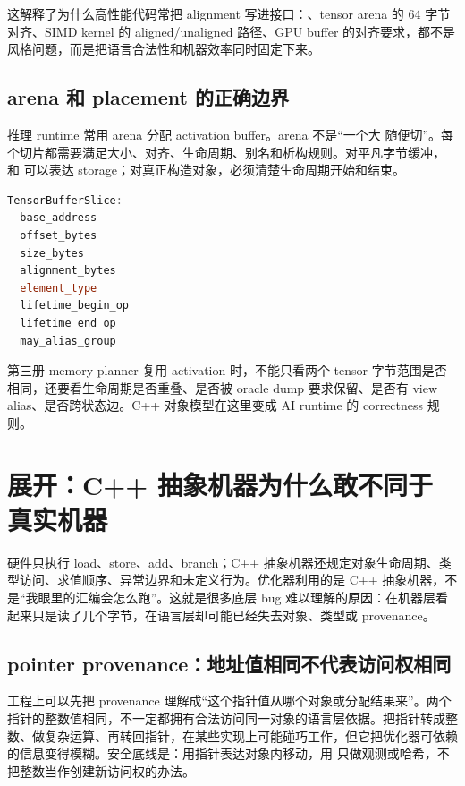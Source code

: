 这解释了为什么高性能代码常把 alignment 写进接口：、tensor arena 的 64 字节对齐、SIMD kernel 的 aligned/unaligned 路径、GPU buffer 的对齐要求，都不是风格问题，而是把语言合法性和机器效率同时固定下来。

\subsection{arena 和 placement 的正确边界}

推理 runtime 常用 arena 分配 activation buffer。arena 不是“一个大  随便切”。每个切片都需要满足大小、对齐、生命周期、别名和析构规则。对平凡字节缓冲， 和  可以表达 storage；对真正构造对象，必须清楚生命周期开始和结束。

\begin{lstlisting}[language=C++,caption={arena 设计要记录的不只是 offset}]
TensorBufferSlice:
  base_address
  offset_bytes
  size_bytes
  alignment_bytes
  element_type
  lifetime_begin_op
  lifetime_end_op
  may_alias_group
\end{lstlisting}

第三册 memory planner 复用 activation 时，不能只看两个 tensor 字节范围是否相同，还要看生命周期是否重叠、是否被 oracle dump 要求保留、是否有 view alias、是否跨状态边。C++ 对象模型在这里变成 AI runtime 的 correctness 规则。

\section{展开：C++ 抽象机器为什么敢不同于真实机器}

硬件只执行 load、store、add、branch；C++ 抽象机器还规定对象生命周期、类型访问、求值顺序、异常边界和未定义行为。优化器利用的是 C++ 抽象机器，不是“我眼里的汇编会怎么跑”。这就是很多底层 bug 难以理解的原因：在机器层看起来只是读了几个字节，在语言层却可能已经失去对象、类型或 provenance。

\subsection{pointer provenance：地址值相同不代表访问权相同}

工程上可以先把 provenance 理解成“这个指针值从哪个对象或分配结果来”。两个指针的整数值相同，不一定都拥有合法访问同一对象的语言层依据。把指针转成整数、做复杂运算、再转回指针，在某些实现上可能碰巧工作，但它把优化器可依赖的信息变得模糊。安全底线是：用指针表达对象内移动，用  只做观测或哈希，不把整数当作创建新访问权的办法。

